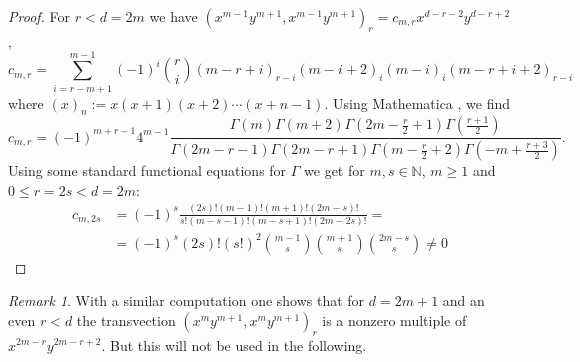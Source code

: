 \documentclass{amsart}
\theoremstyle{definition}
\theoremstyle{remark}
\newtheorem{rem}[thm]{Remark}
\begin{document}
\begin{proof}
For $r < d=2m$ we have $(x^{m-1}y^{m+1},x^{m-1}y^{m+1})_{r} = c_{m,r} x^{d-r-2}y^{d-r+2}$, 
\[\tag{$*$}
c_{m,r}=\sum_{i=r-m+1}^{m-1} (-1)^{i}\binom{r}{i} (m-r+i)_{r-i}(m-i+2)_{i}(m-i)_{i}(m-r+i+2)_{r-i}
\]
where $(x)_{n}:= x(x+1)(x+2)\cdots (x+n-1)$. Using Mathematica \cite{Re2016Mathematica}, we find
{\small
$$
c_{m,r} = (-1)^{m+r-1}4^{m-1}\frac{\Gamma(m)\Gamma(m+2)\Gamma(2m-\frac{r}{2}+1)\Gamma(\frac{r+1}{2})}{\Gamma(2m-r-1)\Gamma(2m-r+1)\Gamma(m-\frac{r}{2}+2)\Gamma(-m+\frac{r+3}{2})}.
$$}
Using some standard functional equations for $\Gamma$ we get for $m,s\in{\mathbb N}$, $m\geq 1$ and $0\leq r=2s<d=2m$:
\[\tag{$**$}
\begin{split}
c_{m,2s} &=(-1)^{s} \frac{(2s)!(m-1)!(m+1)!(2m-s)!}{s!(m-s-1)!(m-s+1)!(2m-2s)!} = \\
&=(-1)^{s}(2s)!(s!)^{2}\binom{m-1}{s}\binom{m+1}{s}\binom{2m-s}{s} \neq 0
\end{split}
\]
\end{proof}

\begin{rem} With a similar computation one shows that for $d=2m+1$ and an even $r<d$ the transvection $(x^{m}y^{m+1},x^{m}y^{m+1})_{r}$ is a nonzero multiple of $x^{2m-r}y^{2m-r+2}$. But this will not be used in the following.
\end{rem}
\end{document}
